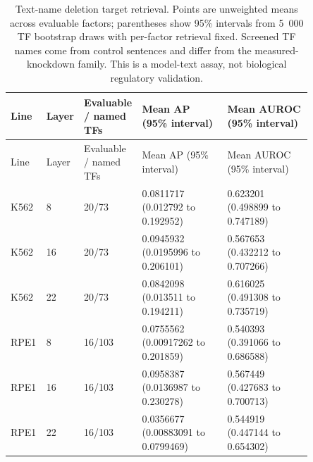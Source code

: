 \begin{longtable}{@{}L{0.08\linewidth}L{0.06\linewidth}L{0.13\linewidth}L{0.29\linewidth}L{0.29\linewidth}@{}}
\caption{Text-name deletion target retrieval. Points are unweighted means across evaluable factors; parentheses show 95\% intervals from 5~000 TF bootstrap draws with per-factor retrieval fixed. Screened TF names come from control sentences and differ from the measured-knockdown family. This is a model-text assay, not biological regulatory validation.}\\
\toprule
Line & Layer & Evaluable / named TFs & Mean AP (95\% interval) & Mean AUROC (95\% interval) \\
\midrule
\endfirsthead
\toprule
Line & Layer & Evaluable / named TFs & Mean AP (95\% interval) & Mean AUROC (95\% interval) \\
\midrule
\endhead
\endfoot
\bottomrule
\endlastfoot
K562 & 8 & 20/73 & 0.0811717 (0.012792 to 0.192952) & 0.623201 (0.498899 to 0.747189) \\
K562 & 16 & 20/73 & 0.0945932 (0.0195996 to 0.206101) & 0.567653 (0.432212 to 0.707266) \\
K562 & 22 & 20/73 & 0.0842098 (0.013511 to 0.194211) & 0.616025 (0.491308 to 0.735719) \\
RPE1 & 8 & 16/103 & 0.0755562 (0.00917262 to 0.201859) & 0.540393 (0.391066 to 0.686588) \\
RPE1 & 16 & 16/103 & 0.0958387 (0.0136987 to 0.230278) & 0.567449 (0.427683 to 0.700713) \\
RPE1 & 22 & 16/103 & 0.0356677 (0.00883091 to 0.0799469) & 0.544919 (0.447144 to 0.654302) \\
\end{longtable}
